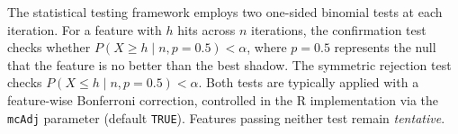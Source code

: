 \documentclass[runningheads]{llncs}
\begin{document}


The statistical testing framework employs two one-sided binomial tests at each iteration. For a feature with $h$ hits across $n$ iterations, the confirmation test checks whether $P(X \geq h \mid n, p=0.5) < \alpha$, where $p = 0.5$ represents the null that the feature is no better than the best shadow. The symmetric rejection test checks $P(X \leq h \mid n, p=0.5) < \alpha$. Both tests are typically applied with a feature-wise Bonferroni correction, controlled in the R implementation via the \texttt{mcAdj} parameter (default \texttt{TRUE}). Features passing neither test remain \emph{tentative}.
\end{document}
